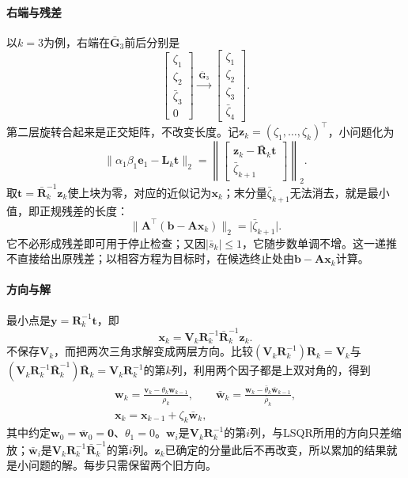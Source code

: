 \paragraph{右端与残差}
以$k=3$为例，右端在$\bar{\bm G}_3$前后分别是
\[
 \begin{bmatrix}\zeta_1\\\zeta_2\\\bar\zeta_3\\0\end{bmatrix}
 \xrightarrow{\ \bar{\bm G}_3\ }
 \begin{bmatrix}\zeta_1\\\zeta_2\\\zeta_3\\\bar\zeta_4\end{bmatrix}.
\]
第二层旋转合起来是正交矩阵，不改变长度。记$\bm z_k=(\zeta_1,\ldots,\zeta_k)^\top$，小问题化为
\[
 \lVert\alpha_1\beta_1\bm e_1-\bm L_k\bm t\rVert_2
 =\left\lVert\begin{bmatrix}\bm z_k-\bar{\bm R}_k\bm t\\ \bar\zeta_{k+1}\end{bmatrix}\right\rVert_2 .
\]
取$\bm t=\bar{\bm R}_k^{-1}\bm z_k$使上块为零，对应的近似记为$\bm x_k$；末分量$\bar\zeta_{k+1}$无法消去，就是最小值，即正规残差的长度：
\begin{equation}
 \lVert\bm A^\top(\bm b-\bm A\bm x_k)\rVert_2=\lvert\bar\zeta_{k+1}\rvert .
 \label{eq:ls-lsmr-estimate}
\end{equation}
它不必形成残差即可用于停止检查；又因$\lvert\bar s_k\rvert\le1$，它随步数单调不增。这一递推不直接给出原残差；以相容方程为目标时，在候选终止处由$\bm b-\bm A\bm x_k$计算。

\paragraph{方向与解}
最小点是$\bm y=\bm R_k^{-1}\bm t$，即
\begin{equation}
 \bm x_k=\bm V_k\bm R_k^{-1}\bar{\bm R}_k^{-1}\bm z_k .
 \label{eq:ls-lsmr-solution}
\end{equation}
不保存$\bm V_k$，而把两次三角求解变成两层方向。比较$(\bm V_k\bm R_k^{-1})\bm R_k=\bm V_k$与$(\bm V_k\bm R_k^{-1}\bar{\bm R}_k^{-1})\bar{\bm R}_k=\bm V_k\bm R_k^{-1}$的第$k$列，利用两个因子都是上双对角的，得到
\begin{equation}
 \begin{gathered}
 \bm w_k=\frac{\bm v_k-\theta_k\bm w_{k-1}}{\rho_k},\qquad
 \bar{\bm w}_k=\frac{\bm w_k-\bar\theta_k\bar{\bm w}_{k-1}}{\bar\rho_k},\\
 \bm x_k=\bm x_{k-1}+\zeta_k\bar{\bm w}_k ,
 \end{gathered}
 \label{eq:ls-lsmr-update}
\end{equation}
其中约定$\bm w_0=\bar{\bm w}_0=\bm0$、$\theta_1=0$。$\bm w_i$是$\bm V_k\bm R_k^{-1}$的第$i$列，与LSQR所用的方向只差缩放；$\bar{\bm w}_i$是$\bm V_k\bm R_k^{-1}\bar{\bm R}_k^{-1}$的第$i$列。$\bm z_k$已确定的分量此后不再改变，所以累加的结果就是小问题的解。每步只需保留两个旧方向。

